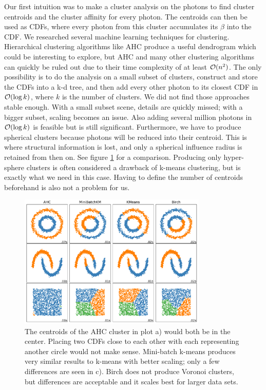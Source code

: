 Our first intuition was to make a cluster analysis on the photons to find cluster centroids and the cluster affinity for every photon. The centroids can then be used as CDFs, where every photon from this cluster accumulates its $\beta$ into the CDF. We researched several machine learning techniques for clustering. Hierarchical clustering algorithms like AHC produce a useful dendrogram which could be interesting to explore, but AHC and many other clustering algorithms can quickly be ruled out due to their time complexity of at least $\mathcal{O}(n^2)$. The only possibility is to do the analysis on a small subset of clusters, construct and store the CDFs into a k-d tree, and then add every other photon to its closest CDF in $\mathcal{O}(\log k)$, where $k$ is the number of clusters. We did not find those approaches stable enough. With a small subset scene, details are quickly missed; with a bigger subset, scaling becomes an issue. Also adding several million photons in $\mathcal{O}(\log k)$ is feasible but is still significant. Furthermore, we have to produce spherical clusters because photons will be reduced into their centroid. This is where structural information is lost, and only a spherical influence radius is retained from then on. See figure \ref{fig:clustering} for a comparison. Producing only hyper-sphere clusters is often considered a drawback of k-means clustering, but is exactly what we need in this case. Having to define the number of centroids beforehand is also not a problem for us.

\begin{figure}
    \centering
    \includegraphics[width=0.8\textwidth]{figures/plots/mlclustering.pdf}
    \caption{The centroids of the AHC cluster in plot a) would both be in the center. Placing two CDFs close to each other with each representing another circle would not make sense. Mini-batch k-means produces very similar results to k-means with better scaling; only a few differences are seen in c). Birch does not produce Voronoi clusters, but differences are acceptable and it scales best for larger data sets.}
    \label{fig:clustering}
\end{figure}
    
